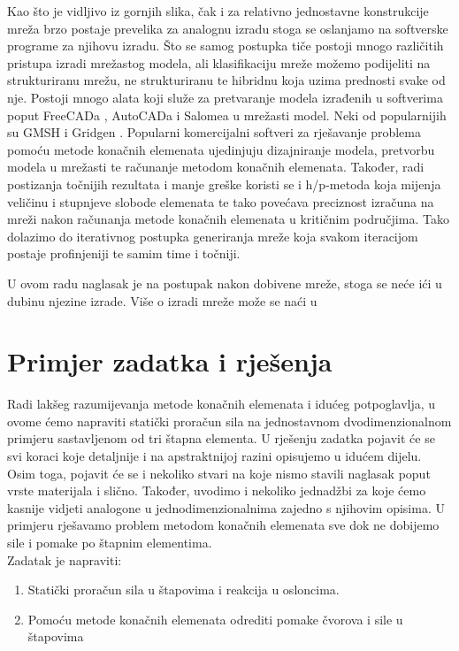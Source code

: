 \documentclass[a4paper,twoside,12pt]{memoir} %
\begin{document}
\par
Kao što je vidljivo iz gornjih slika, čak i za relativno jednostavne konstrukcije mreža brzo postaje prevelika za analognu izradu stoga se oslanjamo na softverske programe za njihovu izradu. Što se samog postupka tiče postoji mnogo različitih pristupa izradi mrežastog modela, ali klasifikaciju mreže možemo podijeliti na strukturiranu mrežu, ne strukturiranu te hibridnu koja uzima prednosti svake od nje. Postoji mnogo alata koji služe za pretvaranje modela izrađenih u softverima poput FreeCADa \cite{freecad_program_web}, AutoCADa \cite{autocad_program_web} i Salomea \cite{salome_program_web} u mrežasti model. Neki od popularnijih su GMSH \cite{gmsh_program_web} i Gridgen \cite{gridgen_program_web}. Popularni komercijalni softveri za rješavanje problema pomoću metode konačnih elemenata ujedinjuju dizajniranje modela, pretvorbu modela u mrežasti te računanje metodom konačnih elemenata. Također, radi postizanja točnijih rezultata i manje greške koristi se i h/p-metoda koja mijenja veličinu i stupnjeve slobode elemenata te tako povećava preciznost izračuna na mreži nakon računanja metode konačnih elemenata u kritičnim područjima. Tako dolazimo do iterativnog postupka generiranja mreže koja svakom iteracijom postaje profinjeniji te samim time i točniji. \par 

U ovom radu naglasak je na postupak nakon dobivene mreže, stoga se neće ići u dubinu njezine izrade. Više o izradi mreže može se naći u \cite{tadej}

\section{Primjer zadatka i rješenja}
\label{primjer_zadatka_i_rjesenja}
Radi lakšeg razumijevanja metode konačnih elemenata i idućeg potpoglavlja, u ovome ćemo napraviti statički proračun sila na jednostavnom dvodimenzionalnom primjeru sastavljenom od tri štapna elementa. U rješenju zadatka pojavit će se svi koraci koje detaljnije i na apstraktnijoj razini opisujemo u idućem dijelu. Osim toga, pojavit će se i nekoliko stvari na koje nismo stavili naglasak poput vrste materijala i slično. Također, uvodimo i nekoliko jednadžbi za koje ćemo kasnije vidjeti analogone u jednodimenzionalnima zajedno s njihovim opisima. U primjeru rješavamo problem metodom konačnih elemenata sve dok ne dobijemo sile i pomake po štapnim elementima. \\
Zadatak je napraviti: 
\begin{enumerate}
    \item Statički proračun sila u štapovima i reakcija u osloncima.
    \item Pomoću metode konačnih elemenata odrediti pomake čvorova i sile u štapovima
\end{enumerate}
\end{document}
